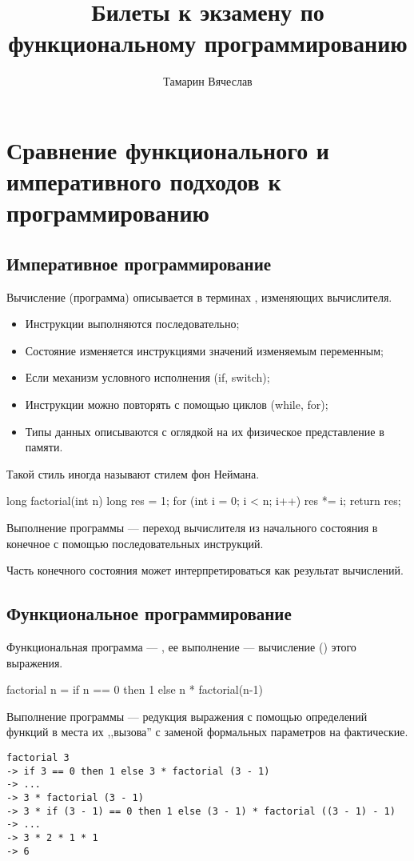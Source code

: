 \documentclass[11pt,a4paper]{article}
\title{Билеты к экзамену по функциональному программированию}
\author{Тамарин Вячеслав}
\begin{document}
\maketitle
\section{Сравнение функционального и императивного подходов к программированию}
\subsection{Императивное программирование}
Вычисление (программа) описывается в терминах , изменяющих  вычислителя.
\begin{itemize}
	\item Инструкции выполняются последовательно;
	\item Состояние изменяется инструкциями  значений изменяемым переменным;
	\item Если механизм условного исполнения (if, switch);
	\item Инструкции можно повторять с помощью циклов (while, for);
	\item Типы данных описываются с оглядкой на их физическое представление в памяти.
\end{itemize}
Такой стиль иногда называют стилем фон Неймана.
\begin{ccode}
long factorial(int n) {
	long res = 1;
	for (int i = 0; i < n; i++) 
		res *= i;
	return res;
}
\end{ccode}
Выполнение программы --- переход вычислителя из начального состояния в конечное с помощью последовательных инструкций.

Часть конечного состояния может интерпретироваться как результат вычислений.

\subsection{Функциональное программирование}
	Функциональная программа --- , ее выполнение --- вычисление () этого выражения.
\begin{hscode}
factorial n = if n == 0 then 1 else n * factorial(n-1)
\end{hscode}
Выполнение программы --- редукция выражения с помощью  определений функций в места их ,,вызова'' с заменой формальных параметров на фактические.
\begin{verbatim}
factorial 3
-> if 3 == 0 then 1 else 3 * factorial (3 - 1)
-> ...
-> 3 * factorial (3 - 1)
-> 3 * if (3 - 1) == 0 then 1 else (3 - 1) * factorial ((3 - 1) - 1)
-> ...
-> 3 * 2 * 1 * 1 
-> 6
\end{verbatim}
\end{document}
